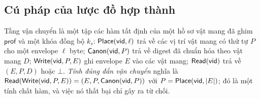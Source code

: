 \subsection{Cú pháp của lược đồ hợp thành}
\label{sec:sec-syntax}

Tầng vận chuyển là một tập các hàm tất định của một hồ sơ vật mang đã ghim
$\mathsf{prof}$ và một khóa đồng bộ $k_s$: $\mathsf{Place}(\mathsf{vid},\ell)$ trả về
các vị trí vật mang có thứ tự $P$ cho một envelope $\ell$ byte;
$\mathsf{Canon}(\mathsf{vid},P)$ trả về digest đã chuẩn hóa theo vật mang $D$;
$\mathsf{Write}(\mathsf{vid},P,E)$ ghi envelope $E$ vào các vật mang;
$\mathsf{Read}(\mathsf{vid})$ trả về $(E,P,D)$ hoặc $\bot$. \emph{Tính đúng đắn vận
chuyển} nghĩa là $\mathsf{Read}(\mathsf{Write}(\mathsf{vid},P,E))=(E,P,\mathsf{Canon}(\mathsf{vid},P))$
với $P=\mathsf{Place}(\mathsf{vid},|E|)$; đó là một tính chất hàm, và việc nó thất bại
chỉ gây ra từ chối.


